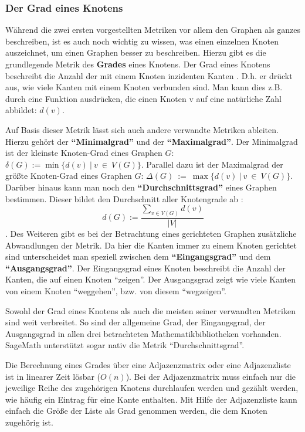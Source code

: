 \documentclass[a4paper,12pt,ngerman,chapterprefix=false,listof=totoc,bibliography=totoc]{scrreprt}
\begin{document}
\subsubsection*{Der Grad eines Knotens}
{
Während die zwei ersten vorgestellten Metriken vor allem den Graphen als ganzes beschreiben, ist es auch noch wichtig zu wissen, was einen einzelnen Knoten auszeichnet, um einen Graphen besser zu beschreiben. Hierzu gibt es die grundlegende Metrik des \textbf{Grades} eines Knotens. Der Grad eines Knotens beschreibt die Anzahl der mit einem Knoten inzidenten Kanten \cite{diestel_graphentheorie_2000}. D.h. er drückt aus, wie viele Kanten mit einem Knoten verbunden sind. Man kann dies z.B. durch eine Funktion ausdrücken, die einen Knoten v auf eine natürliche Zahl abbildet: \(d(v)\).

Auf Basis dieser Metrik lässt sich auch andere verwandte Metriken ableiten. Hierzu gehört der \textbf{"`Minimalgrad"'} und der \textbf{"`Maximalgrad"'}. Der Minimalgrad ist der kleinste Knoten-Grad eines Graphen \(G\): \(\delta (G):=\min\{d(v)\ \vert\ v\ \in\ V(G)\}\). Parallel dazu ist der Maximalgrad der größte Knoten-Grad eines Graphen \(G\): \(\Delta (G)\ :=\ \max\{d(v)\ \vert\ v\ \in\ V(G)\}\). Darüber hinaus kann man noch den \textbf{"`Durchschnittsgrad"'} eines Graphen bestimmen. Dieser bildet den Durchschnitt aller Knotengrade ab \cite{diestel_graphentheorie_2000}:
\[
	d(G):=\frac{\sum_{v\in V(G)}d(v)}{\vert V\vert}
\]. 
Des Weiteren gibt es bei der Betrachtung eines gerichteten Graphen zusätzliche Abwandlungen der Metrik. Da hier die Kanten immer zu einem Knoten gerichtet sind unterscheidet man speziell zwischen dem \textbf{"`Eingangsgrad"'} und dem \textbf{"`Ausgangsgrad"'}. Der Eingangsgrad eines Knoten beschreibt die Anzahl der Kanten, die auf einen Knoten "`zeigen"'. Der Ausgangsgrad zeigt wie viele Kanten von einem Knoten "`weggehen"', bzw. von diesem "`wegzeigen"'. \cite{balakrishnan_schaums_1997}

Sowohl der Grad eines Knotens als auch die meisten seiner verwandten Metriken sind weit verbreitet. So sind der allgemeine Grad, der Eingangsgrad, der Ausgangsgrad in allen drei betrachteten Mathematikbibliotheken vorhanden. SageMath unterstützt sogar nativ die Metrik "`Durchschnittsgrad"'. \cite{sagemath_graph_2020,matlab_directed_2020,wolfram_graph_2020}

Die Berechnung eines Grades über eine Adjazenzmatrix oder eine Adjazenzliste ist in linearer Zeit lösbar (\(O(n)\)). Bei der Adjazenzmatrix muss einfach nur die jeweilige Reihe des zugehörigen Knotens durchlaufen werden und gezählt werden, wie häufig ein Eintrag für eine Kante enthalten. Mit Hilfe der Adjazenzliste kann einfach die Größe der Liste als Grad genommen werden, die dem Knoten zugehörig ist.
}
\end{document}
